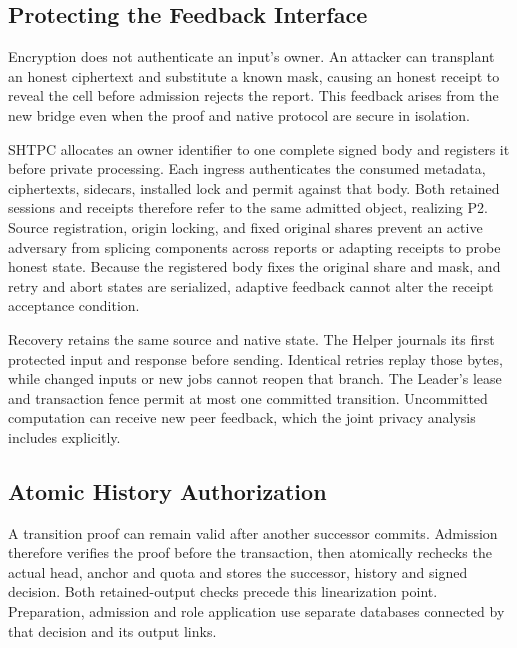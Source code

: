 \documentclass[conference,compsoc]{IEEEtran}
\theoremstyle{definition}
\numberwithin{equation}{section}
\numberwithin{table}{section}
\numberwithin{figure}{section}
\theoremstyle{plain}
\begin{document}
\subsection{Protecting the Feedback Interface}
\label{sec:origin-feedback}
\label{sec:cross-role}

Encryption does not authenticate an input's owner. An attacker can transplant
an honest ciphertext and substitute a known mask, causing an honest receipt to
reveal the cell before admission rejects the report. This feedback arises from
the new bridge even when the proof and native protocol are secure in isolation.

SHTPC allocates an owner identifier to one complete signed body and registers
it before private processing. Each ingress authenticates the consumed metadata,
ciphertexts, sidecars, installed lock and permit against that body. Both
retained sessions and receipts therefore refer to the same admitted object,
realizing P2. Source registration, origin locking, and fixed original shares prevent
an active adversary from splicing components across reports or adapting receipts to
probe honest state. Because the registered body fixes the original share and mask,
and retry and abort states are serialized, adaptive feedback
cannot alter the receipt acceptance condition.

Recovery retains the same source and native state. The Helper journals its
first protected input and response before sending. Identical retries replay
those bytes, while changed inputs or new jobs cannot reopen that branch. The
Leader's lease and transaction fence permit at most one committed transition.
Uncommitted computation can receive new peer feedback, which the joint privacy
analysis includes explicitly.

\subsection{Atomic History Authorization}
\label{sec:admission}

A transition proof can remain valid after another successor commits. Admission
therefore verifies the proof before the transaction, then atomically rechecks
the actual head, anchor and quota and stores the successor, history and signed
decision. Both retained-output checks
precede this linearization point. Preparation, admission and role application
use separate databases connected by that decision and its output links.
\end{document}
